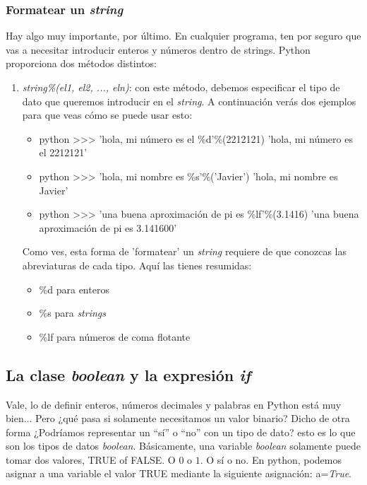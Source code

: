 \documentclass{article}
\begin{document}
\subsubsection{Formatear un \textit{string}}
Hay algo muy importante, por último. En cualquier programa, ten por seguro que vas a necesitar introducir enteros y números dentro de strings. Python proporciona dos métodos distintos:
\begin{enumerate}
    \item \textit{string\%(el1, el2, ..., eln)}: con este método, debemos especificar el tipo de dato que queremos introducir en el \textit{string}. A continuación verás dos ejemplos para que veas cómo se puede usar esto:
    \begin{itemize}
        \item \begin{mintedbox}{python}
        >>> 'hola, mi número es el \%d'\%(2212121)
'hola, mi número es el 2212121'
        \end{mintedbox} 
        \item \begin{mintedbox}{python}
        >>> 'hola, mi nombre es \%s'\%('Javier')
'hola, mi nombre es Javier'
        \end{mintedbox}
        \item \begin{mintedbox}{python}
        >>> 'una buena aproximación de pi es \%lf'\%(3.1416)
'una buena aproximación de pi es 3.141600'
        \end{mintedbox}
        
    \end{itemize}
    Como ves, esta forma de 'formatear' un \textit{string} requiere de que conozcas las abreviaturas de cada tipo. Aquí las tienes resumidas:\begin{itemize}
        \item \%d para enteros
        \item \%s para \textit{strings}
        \item \%lf para números de coma flotante
    \end{itemize}
\end{enumerate}




\subsection{La clase \textit{boolean} y la expresión \textit{if}}
Vale, lo de definir enteros, números decimales y palabras en Python está muy bien... Pero ¿qué pasa si solamente necesitamos un valor binario? Dicho de otra forma ¿Podríamos representar un ``sí'' o ``no'' con un tipo de dato? esto es lo que son los tipos de datos \textit{boolean}. Básicamente, una variable \textit{boolean} solamente puede tomar dos valores, TRUE of FALSE. O $0$ o $1$. O sí o no. En python, podemos asignar a una variable el valor TRUE mediante la siguiente asignación: a=\textit{True}.
\end{document}
